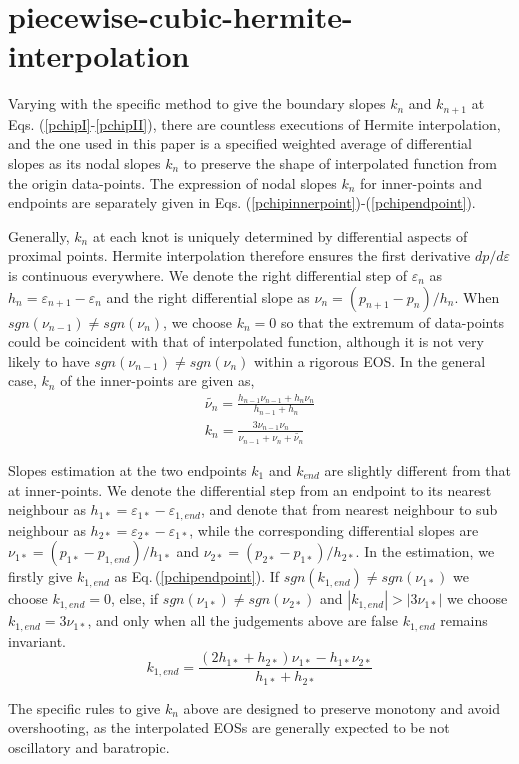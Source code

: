 \documentclass[preprint,tightenlines,eqsecnum,floats,aps,amsmath,amssymb,nofootinbib,prd,showpacs]{revtex4}
\begin{document}




\appendix

\section{piecewise-cubic-hermite-interpolation}
Varying with the specific method to give the boundary slopes $k_n$ and $k_{n+1}$ at Eqs. (\ref{pchipI}-\ref{pchipII}), there are countless executions of Hermite interpolation, and the one used in this paper is a specified weighted average of differential slopes as its nodal slopes $k_n$ to preserve the shape of interpolated function from the origin data-points. The expression of nodal slopes $k_n$ for inner-points and endpoints are separately given in Eqs. (\ref{pchipinnerpoint})-(\ref{pchipendpoint}).

Generally, $k_{n}$ at each knot is uniquely determined by differential aspects of proximal points. Hermite interpolation therefore ensures the first derivative $dp/d\varepsilon$ is continuous everywhere. We denote the right differential step of $\varepsilon_n$ as $h_n=\varepsilon_{n+1} - \varepsilon_n$ and the right differential slope as $\nu_n=(p_{n+1}-p_n)/h_n$. When $sgn(\nu_{n-1}) \ne sgn(\nu_{n})$, we choose $k_n = 0$ so that the extremum of data-points could be coincident with that of interpolated function, although it is not very likely to have $sgn(\nu_{n-1}) \ne sgn(\nu_{n})$ within a rigorous EOS. In the general case, $k_n$ of the inner-points are given as,
\begin{equation} \label{pchipinnerpoint}
\begin{array}{l}
\widetilde {{\nu _n}} = \frac{{{h_{n - 1}}{\nu _{n - 1}} + {h_n}{\nu _n}}}{{{h_{n - 1}} + {h_n}}}\\
{k_n} = \frac{{3{\nu _{n - 1}}{\nu _n}}}{{{\nu _{n - 1}} + {\nu _n} + \widetilde {{\nu _n}}}}
\end{array}
\end{equation}

Slopes estimation at the two endpoints $k_1$ and $k_{end}$ are slightly different from that at inner-points. We denote the differential step from an endpoint to its nearest neighbour as $h_{1*}=\varepsilon_{1*}-\varepsilon_{1,end}$, and denote that from nearest neighbour to sub neighbour as $h_{2*}=\varepsilon_{2*}-\varepsilon_{1*}$, while the corresponding differential slopes are $\nu _{1*}=(p_{1*}-p_{1,end})/h_{1*}$ and $\nu _{2*}=(p_{2*}-p_{1*})/h_{2*}$. In the estimation, we firstly give $k_{1,end}$ as Eq.$\,$(\ref{pchipendpoint}). If $sgn(k_{1,end}) \ne sgn(\nu_{1*})$ we choose $k_{1,end}=0$, else, if $sgn(\nu_{1*}) \ne sgn(\nu_{2*})$ and $\left| k_{1,end} \right| > \left| 3\nu_{1*} \right|$ we choose $k_{1,end}=3\nu_{1*}$, and only when all the judgements above are false $k_{1,end}$ remains invariant.
\begin{equation} \label{pchipendpoint}
{k_{1,end}} = \frac{{\left( {2{h_{1*}} + {h_{2*}}} \right){\nu _{1*}} - {h_{1*}}{\nu _{2*}}}}{{{h_{1*}} + {h_{2*}}}}
\end{equation}

The specific rules to give $k_{n}$ above are designed to preserve monotony and avoid overshooting, as the interpolated EOSs are generally expected to be not oscillatory and baratropic.
\end{document}
